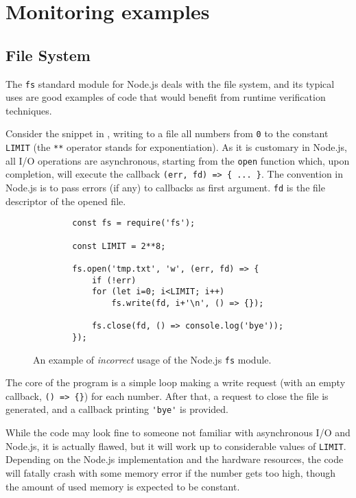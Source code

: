 \section{Monitoring examples}
\label{sec:examples}
\subsection{File System}
The \lstinline{fs} standard module for Node.js deals with the file system, and its typical uses are good examples of code that would benefit from runtime verification techniques.

Consider the snippet in , writing to a file all numbers from \lstinline{0} to the constant \lstinline{LIMIT} (the \lstinline{**} operator stands for exponentiation).
As it is customary in Node.js, all I/O operations are asynchronous, starting from the \lstinline{open} function which, upon completion, will execute the callback \lstinline!(err, fd) => { ... }!.
The convention in Node.js is to pass errors (if any) to callbacks as first argument.
\lstinline{fd} is the file descriptor of the opened file.

\begin{figure}[h]
	\begin{lstlisting}
		const fs = require('fs');
		
		const LIMIT = 2**8;
		
		fs.open('tmp.txt', 'w', (err, fd) => {
			if (!err)
			for (let i=0; i<LIMIT; i++)
				fs.write(fd, i+'\n', () => {});
			
			fs.close(fd, () => console.log('bye'));
		});
	\end{lstlisting}
	\caption{An example of \emph{incorrect} usage of the Node.js \lstinline{fs} module.}
	\label{lst:fs}
\end{figure}

The core of the program is a simple loop making a write request (with an empty callback, \lstinline!() => {}!) for each number.
After that, a request to close the file is generated, and a callback printing \lstinline{'bye'} is provided.

While the code may look fine to someone not familiar with asynchronous I/O and Node.js, it is actually flawed, but it will work up to considerable values of \lstinline{LIMIT}.
Depending on the Node.js implementation and the hardware resources, the code will fatally crash with some memory error if the number gets too high, though the amount of used memory is expected to be constant.

